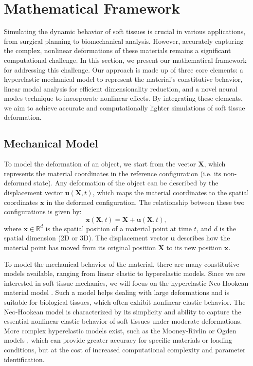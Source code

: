 \section{Mathematical Framework}
\label{sec:problem_setting}

Simulating the dynamic behavior of soft tissues is crucial in various applications, from surgical planning to biomechanical analysis. However, accurately capturing the complex, nonlinear deformations of these materials remains a significant computational challenge. In this section, we present our mathematical framework for addressing this challenge. Our approach is made up of three core elements: a hyperelastic mechanical model to represent the material's constitutive behavior, linear modal analysis for efficient dimensionality reduction, and a novel neural modes technique to incorporate nonlinear effects. By integrating these elements, we aim to achieve accurate and computationally lighter simulations of soft tissue deformation.


\subsection{Mechanical Model}
\label{sec:mechanical_model}

To model the deformation of an object, we start from the vector \(\bm{X}\), which represents the material coordinates in the reference configuration (i.e. its non-deformed state). Any deformation of the object can be described by the displacement vector \(\bm{u}(\bm{X},t)\), which maps the material coordinates to the spatial coordinates \(\bm{x}\) in the deformed configuration. The relationship between these two configurations is given by:
\begin{equation}
    \bm{x}(\bm{X},t) = \bm{X} + \bm{u}(\bm{X},t),
\label{eq:deformation}
\end{equation}
where \(\bm{x} \in \mathbb{R}^d\) is the spatial position of a material point at time \(t\), and \(d\) is the spatial dimension (2D or 3D). The displacement vector \(\bm{u}\) describes how the material point has moved from its original position \(\bm{X}\) to its new position \(\bm{x}\).

To model the mechanical behavior of the material, there are many constitutive models available, ranging from linear elastic to hyperelastic models. Since we are interested in soft tissue mechanics, we will focus on the hyperelastic Neo-Hookean material model \cite{Ogden_1997}. Such a model helps dealing with large deformations and is suitable for biological tissues, which often exhibit nonlinear elastic behavior. The Neo-Hookean model is characterized by its simplicity and ability to capture the essential nonlinear elastic behavior of soft tissues under moderate deformations. More complex hyperelastic models exist, such as the Mooney-Rivlin or Ogden models \cite{Ogden_1997}, which can provide greater accuracy for specific materials or loading conditions, but at the cost of increased computational complexity and parameter identification.

